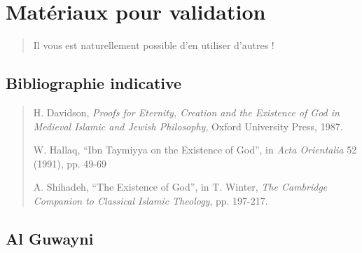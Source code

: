 \chapter{Matériaux pour validation}

 

\begin{quote}
Il vous est naturellement possible d'en utiliser d'autres !
\end{quote}

\hypertarget{bibliographie-indicative}{%
\section{Bibliographie indicative}\label{bibliographie-indicative}}

\begin{quote}
H. Davidson, \emph{Proofs for Eternity, Creation and the Existence of
God in Medieval Islamic and Jewish Philosophy}, Oxford University Press,
1987.

W. Hallaq, ``Ibn Taymiyya on the Existence of God'', in \emph{Acta
Orientalia} 52 (1991), pp. 49-69

A. Shihadeh, ``The Existence of God'', in T. Winter, \emph{The Cambridge
Companion to Classical Islamic Theology}, pp. 197-217.
\end{quote}
 

\section{Al Guwayni} 

